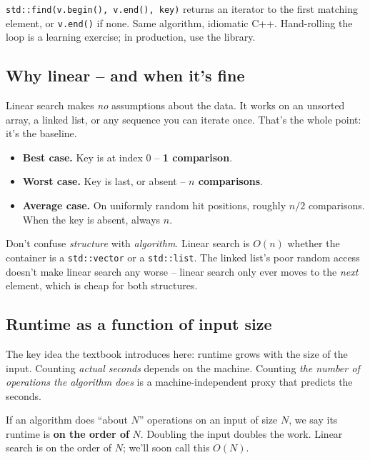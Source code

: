 \documentclass[11pt]{article}
\begin{document}
\begin{notebox}
\texttt{std::find(v.begin(), v.end(), key)} returns an iterator to
the first matching element, or \texttt{v.end()} if none. Same
algorithm, idiomatic C++. Hand-rolling the loop is a learning
exercise; in production, use the library.
\end{notebox}

\subsection{Why linear -- and when it's fine}

Linear search makes \emph{no} assumptions about the data. It works
on an unsorted array, a linked list, or any sequence you can iterate
once. That's the whole point: it's the baseline.

\begin{itemize}[leftmargin=*]
  \item \textbf{Best case.} Key is at index 0 -- \textbf{1 comparison}.
  \item \textbf{Worst case.} Key is last, or absent -- \textbf{$n$ comparisons}.
  \item \textbf{Average case.} On uniformly random hit positions,
        roughly $n/2$ comparisons. When the key is absent, always $n$.
\end{itemize}

\begin{warnbox}
Don't confuse \emph{structure} with \emph{algorithm}. Linear search
is $O(n)$ whether the container is a \texttt{std::vector} or a
\texttt{std::list}. The linked list's poor random access doesn't
make linear search any worse -- linear search only ever moves to the
\emph{next} element, which is cheap for both structures.
\end{warnbox}

\subsection{Runtime as a function of input size}

The key idea the textbook introduces here: runtime grows with the
size of the input. Counting \emph{actual seconds} depends on the
machine. Counting \emph{the number of operations the algorithm does}
is a machine-independent proxy that predicts the seconds.

\begin{ideabox}
If an algorithm does ``about $N$'' operations on an input of size
$N$, we say its runtime is \textbf{on the order of} $N$. Doubling
the input doubles the work. Linear search is on the order of $N$;
we'll soon call this $O(N)$.
\end{ideabox}
\end{document}
